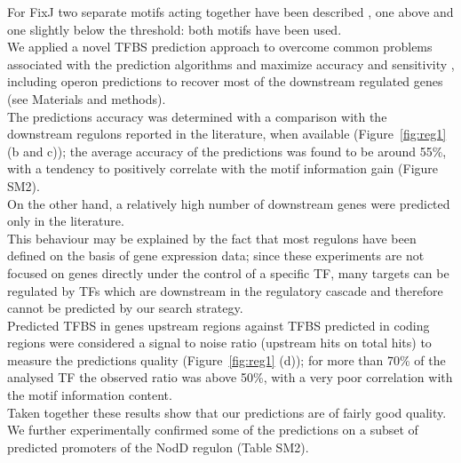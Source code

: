 For FixJ two separate motifs acting together have been described \cite{ferrieres2002two}, one above and one slightly below the threshold: both motifs have been used.\\
We applied a novel TFBS prediction approach to overcome common problems associated with the prediction algorithms and maximize accuracy and sensitivity \cite{van2009mechanisms}, including operon predictions to recover most of the downstream regulated genes (see Materials and methods).\\
 The predictions accuracy was determined with a comparison with the downstream regulons reported in the literature, when available (Figure~\ref{fig:reg1} (b and c)); the average accuracy of the predictions was found to be around 55\%, with a tendency to positively correlate with the motif information gain (Figure SM2).\\
On the other hand, a relatively high number of downstream genes were predicted only in the literature.\\
This behaviour may be explained by the fact that most regulons have been defined on the basis of gene expression data; since these experiments are not focused on genes directly under the control of a specific TF, many targets can be regulated by TFs which are downstream in the regulatory cascade and therefore cannot be predicted by our search strategy.\\
Predicted TFBS in genes upstream regions against TFBS predicted in coding regions were considered a signal to noise ratio (upstream hits on total hits) to measure the predictions quality (Figure~\ref{fig:reg1} (d)); for more than 70\% of the analysed TF the observed ratio was above 50\%, with a very poor correlation with the motif information content.\\
Taken together these results show that our predictions are of fairly good quality. We further experimentally confirmed some of the predictions on a subset of predicted promoters of the NodD regulon (Table SM2).\\
